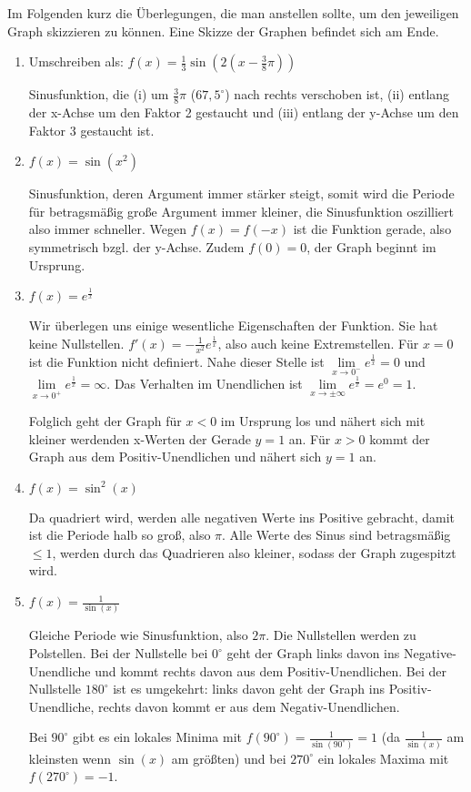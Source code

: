 \item Im Folgenden kurz die Überlegungen, die man anstellen sollte, um den jeweiligen Graph skizzieren zu können. Eine Skizze der Graphen befindet sich am Ende.

\begin{enumerate}

\item Umschreiben als: $f(x) = \frac{1}{3}\sin(2(x-\frac{3}{8}\pi))$

Sinusfunktion, die (i) um $\frac{3}{8}{\pi}$ ($67,5^\circ$) nach rechts verschoben ist, (ii) entlang der x-Achse um den Faktor 2 gestaucht und (iii) entlang der y-Achse um den Faktor $3$ gestaucht ist.

\item $f(x) = \sin(x^2)$

Sinusfunktion, deren Argument immer stärker steigt, somit wird die Periode für betragsmäßig große Argument immer kleiner, die Sinusfunktion oszilliert also immer schneller. Wegen $f(x) = f(-x)$ ist die Funktion gerade, also symmetrisch bzgl. der y-Achse. Zudem $f(0) = 0$, der Graph beginnt im Ursprung.

\item $f(x) = e^\frac{1}{x}$

Wir überlegen uns einige wesentliche Eigenschaften der Funktion. Sie hat keine Nullstellen. $f'(x)=-\frac{1}{x^2}e^\frac{1}{x}$, also auch keine Extremstellen. Für $x=0$ ist die Funktion nicht definiert. Nahe dieser Stelle ist $\lim\limits_{x\to 0^{-}} e^\frac{1}{x} = 0$ und $\lim\limits_{x\to 0^{+}} e^\frac{1}{x} = \infty$. Das Verhalten im Unendlichen ist $\lim\limits_{x\to\pm\infty} e^\frac{1}{x} = e^0 = 1$.

Folglich geht der Graph für $x < 0$ im Ursprung los und nähert sich mit kleiner werdenden x-Werten der Gerade $y=1$ an. Für $x > 0$ kommt der Graph aus dem Positiv-Unendlichen und nähert sich $y=1$ an.

\item $f(x)=\sin^2(x)$

Da quadriert wird, werden alle negativen Werte ins Positive gebracht, damit ist die Periode halb so groß, also $\pi$. Alle Werte des Sinus sind betragsmäßig $\le 1$, werden durch das Quadrieren also kleiner, sodass der Graph zugespitzt wird.

\item $f(x)=\frac{1}{\sin(x)}$

Gleiche Periode wie Sinusfunktion, also $2\pi$. Die Nullstellen werden zu Polstellen. Bei der Nullstelle bei $0^\circ$ geht der Graph  links davon ins Negative-Unendliche und kommt rechts davon aus dem Positiv-Unendlichen. Bei der Nullstelle $180^\circ$  ist es umgekehrt: links davon geht der Graph ins Positiv-Unendliche, rechts davon kommt er aus dem Negativ-Unendlichen.

Bei $90^\circ$ gibt es ein lokales Minima mit $f(90^\circ) = \frac{1}{\sin(90^\circ)} = 1$ (da $\frac{1}{\sin(x)}$ am kleinsten wenn $\sin(x)$ am größten) und bei $270^\circ$ ein lokales Maxima mit $f(270^\circ) = -1$.

\end{enumerate}

